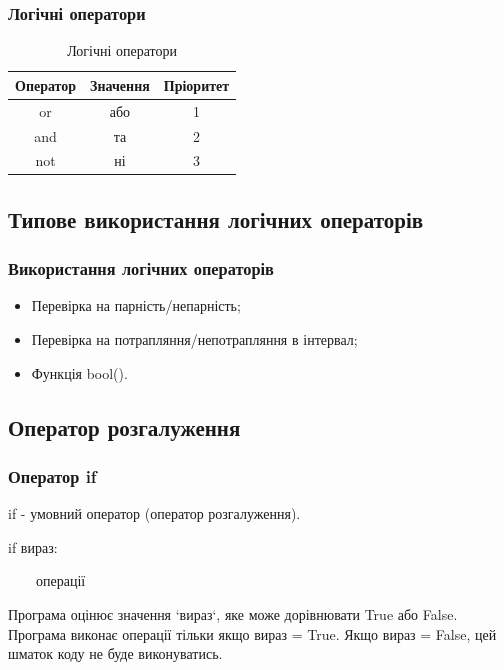 \begin{frame}
\frametitle{Логічні оператори}
\begin{table}
  \caption{Логічні оператори}
  \label{tab:}

  \begin{center}
    \begin{tabular}{|c|c|c|}
    \hline
      \textbf{Оператор} & \textbf{Значення} & \textbf{Пріоритет} \\
    \hline  
      or & або & 1 \\
    \hline
      and & та & 2 \\
    \hline
      not & ні & 3 \\
    \hline
    \end{tabular}
  \end{center}
\end{table}
\end{frame}

\subsection{Типове використання логічних операторів} 
\begin{frame}
\frametitle{Використання логічних операторів}
\begin{itemize}
  \item Перевірка на парність/непарність;
  \item Перевірка на потрапляння/непотрапляння в інтервал;
  \item Функція bool().
 \end{itemize}
\end{frame}

\subsection{Оператор розгалуження} 
\begin{frame}
\frametitle{Оператор if}
if - умовний оператор (оператор розгалуження).

\huge{if вираз:

~~~~операції}


\begin{flushleft}
\normalsize
Програма оцінює значення `вираз`, яке може дорівнювати True або False. Програма виконає операції тільки якщо вираз = True. Якщо вираз = False, цей шматок коду не буде виконуватись.
\end{flushleft}
\end{frame}


